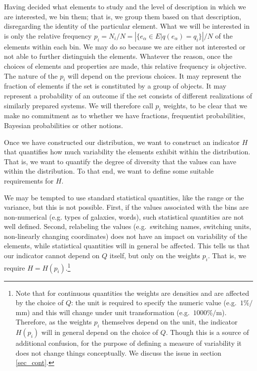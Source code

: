 \documentclass[iopart]{revtex4-1}
\begin{document}
Having decided what elements to study and the level of description in which we are interested, we bin them; that is, we group them based on that description, disregarding the identity of the particular element. What we will be interested in is only the relative frequency $p_i = N_i / N = \left| \{e_\alpha \in E | q(e_\alpha) = q_i \} \right| / N$ of the elements within each bin. We may do so because we are either not interested or not able to further distinguish the elements. Whatever the reason, once the choices of elements and properties are made, this relative frequency is objective. The nature of the $p_i$ will depend on the previous choices. It may represent the fraction of elements if the set is constituted by a group of objects. It may represent a probability of an outcome if the set consists of different realizations of similarly prepared systems. We will therefore call $p_i$ weights, to be clear that we make no commitment as to whether we have fractions, frequentist probabilities, Bayesian probabilities or other notions.

Once we have constructed our distribution, we want to construct an indicator $H$ that quantifies how much variability the elements exhibit within the distribution. That is, we want to quantify the degree of diversity that the values can have within the distribution. To that end, we want to define some suitable requirements for $H$.

We may be tempted to use standard statistical quantities, like the range or the variance, but this is not possible. First, if the values associated with the bins are non-numerical (e.g. types of galaxies, words), such statistical quantities are not well defined. Second, relabeling the values (e.g.~switching names, switching units, non-linearly changing coordinates) does not have an impact on variability of the elements, while statistical quantities will in general be affected. This tells us that our indicator cannot depend on $Q$ itself, but only on the weights $p_i$. That is, we require $H=H(p_i)$.\footnote{Note that for continuous quantities the weights are densities and are affected by the choice of $Q$: the unit is required to specify the numeric value (e.g.~$1 \% / $mm) and this will change under unit transformation (e.g.~$1000 \% /$m). Therefore, as the weights $p_i$ themselves depend on the unit, the indicator $H(p_i)$ will in general depend on the choice of $Q$. Though this is a source of additional confusion, for the purpose of defining a measure of variability it does not change things conceptually. We discuss the issue in section \ref{sec_cont}.}
\end{document}
